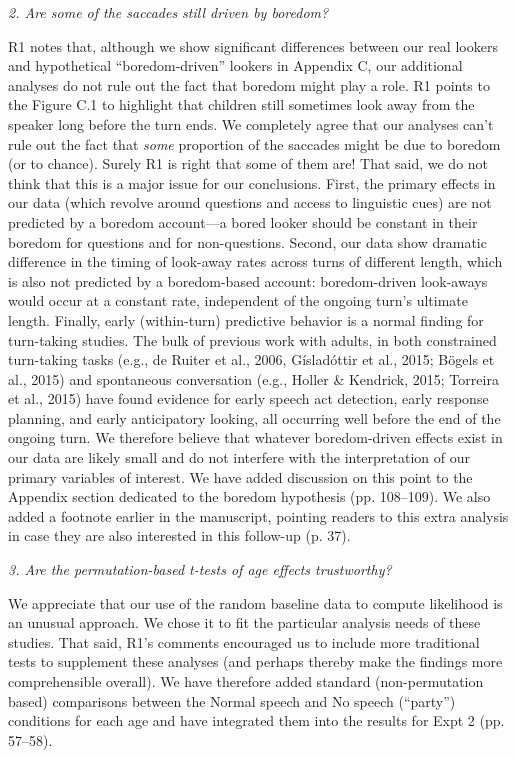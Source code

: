\documentclass[11pt,a4paper]{letter} %
\begin{document}
\begin{letter}{}
\newpage

\noindent \textit{2. Are some of the saccades still driven by boredom?}

\noindent R1 notes that, although we show significant differences between our real lookers and hypothetical ``boredom-driven'' lookers in Appendix C, our additional analyses do not rule out the fact that boredom might play a role. R1 points to the Figure C.1 to highlight that children still sometimes look away from the speaker long before the turn ends. We completely agree that our analyses can't rule out the fact that \textit{some} proportion of the saccades might be due to boredom (or to chance). Surely R1 is right that some of them are! That said, we do not think that this is a major issue for our conclusions. First, the primary effects in our data (which revolve around questions and access to linguistic cues) are not predicted by a boredom account---a bored looker should be constant in their boredom for questions and for non-questions.  Second, our data show dramatic difference in the timing of look-away rates across turns of different length, which is also not predicted by a boredom-based account: boredom-driven look-aways would occur at a constant rate, independent of the ongoing turn's ultimate length. Finally, early (within-turn) predictive behavior is a normal finding for turn-taking studies. The bulk of previous work with adults, in both constrained turn-taking tasks (e.g., de Ruiter et al., 2006, G\'{i}slad\'{o}ttir et al., 2015; B\"{o}gels et al., 2015) and spontaneous conversation (e.g., Holler \& Kendrick, 2015; Torreira et al., 2015) have found evidence for early speech act detection, early response planning, and early anticipatory looking, all occurring well before the end of the ongoing turn. We therefore believe that whatever boredom-driven effects exist in our data are likely small and do not interfere with the interpretation of our primary variables of interest. We have added discussion on this point to the Appendix section dedicated to the boredom hypothesis (pp. 108--109). We also added a footnote earlier in the manuscript, pointing readers to this extra analysis in case they are also interested in this follow-up (p. 37).

\noindent \textit{3. Are the permutation-based t-tests of age effects trustworthy?}

\noindent We appreciate that our use of the random baseline data to compute likelihood is an unusual approach. We chose it to fit the particular analysis needs of these studies. That said, R1's comments encouraged us to include more traditional tests to supplement these analyses (and perhaps thereby make the findings more comprehensible overall). We have therefore added standard (non-permutation based) comparisons between the Normal speech and No speech (``party'') conditions for each age and have integrated them into the results for Expt 2 (pp. 57--58).


\end{letter}
\end{document}

